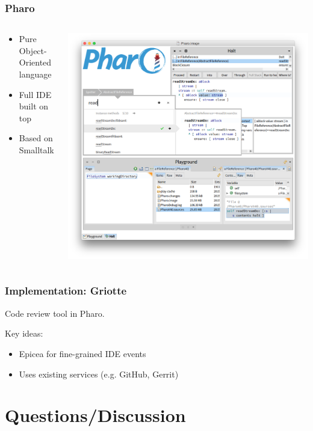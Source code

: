 \documentclass[aspectratio=169]{beamer}
\begin{document}
\begin{frame}
  \frametitle{Pharo}

  \begin{columns}
    \begin{column}{0.4\textwidth}
      \begin{itemize}
      \item Pure Object-Oriented language
      \item Full IDE built on top
      \item Based on Smalltalk
      \end{itemize}
    \end{column}
    \begin{column}{0.6\textwidth}
      \includegraphics[width=\textwidth]{img/pharo.png}
    \end{column}
  \end{columns}
\end{frame}

\begin{frame}[fragile]

\frametitle{Implementation: Griotte}

Code review tool in Pharo.

Key ideas:

\begin{itemize}
\item Epicea for fine-grained IDE events
\item Uses existing services (e.g. GitHub, Gerrit)
\end{itemize}
\end{frame}

\section{Questions/Discussion}
\end{document}
